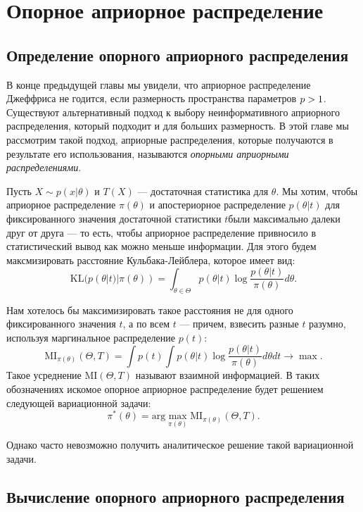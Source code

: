 \section{Опорное априорное распределение}

\subsection{Определение опорного априорного распределения}

В конце предыдущей главы мы увидели, что априорное распределение Джеффриса не годится, если размерность пространства параметров $p > 1$.
Существуют альтернативный подход к выбору неинформативного априорного распределения, который подходит и для больших размерность.
В этой главе мы рассмотрим такой подход, априорные распределения, которые получаются в результате его использования, называются
\emph{опорными априорными распределениями}.

Пусть $X \sim p(x | \theta)$ и $T(X)$ --- достаточная статистика для $\theta$.
Мы хотим, чтобы априорное распределение $\pi(\theta)$ и апостериорное распределение $p(\theta | t)$ для фиксированного значения достаточной статистики $t$были максимально далеки друг от друга --- то есть,
чтобы априорное распределение привносило в статистический вывод как можно меньше информации.
Для этого будем максмизировать расстояние Кульбака-Лейблера, которое имеет вид:
\[
\mathrm{KL}(p(\theta | t) | \pi(\theta)) = \int_{\theta \in \Theta} p(\theta | t) \log \frac{p(\theta | t)}{\pi(\theta)} d\theta.
\]

Нам хотелось бы максимизировать такое расстояния не для одного фиксированного значения $t$, а по всем $t$ --- причем, взвесить разные $t$ разумно,
используя маргинальное распределение $p(t)$:
\[
\mathrm{MI}_{\pi(\theta)}(\Theta, T) = \int p(t) \int p(\theta | t) \log \frac{p(\theta | t)}{\pi(\theta)} d\theta dt \rightarrow \max.
\]
Такое усреднение $\mathrm{MI}(\Theta, T)$ называют взаимной информацией.
В таких обозначениях искомое опорное априорное распределение будет решением следующей вариационной задачи:
\[
\pi^*(\theta) = \mathrm{arg} \max_{\pi(\theta)} \mathrm{MI}_{\pi(\theta)}(\Theta, T).
\]

Однако часто невозможно получить аналитическое решение такой вариационной задачи.

\subsection{Вычисление опорного априорного распределения}

